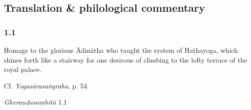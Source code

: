 


\pagestyle{HPed}
\begin{ekdosis}

\chapter*{Translation \& philological commentary}

\subsection*{1.1}
\begin{translation}[hp01_001]
Homage to the glorious Ādinātha who taught the system of Haṭhayoga, which shines forth like a stairway for one desirous of climbing to the lofty terrace of the royal palace.%
\end{translation}

\begin{testimonia}[hp01_001]
Cf. \emph{Yogasārasaṅgraha}, p. 54.

\begin{versinnote}
\end{versinnote}

\emph{Gheraṇḍasaṃhitā} 1.1

\begin{versinnote}
\end{versinnote}

\end{testimonia}


\end{ekdosis}

